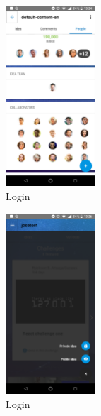 \begin{figure}[!h]
	\begin{center}
		\includegraphics[width=0.3\textwidth]{./img/anexo1/ver_idea_gente_expandido.png}
		\caption{Login}
		\label{fig:ver_idea_gente_expandido}
	\end{center}
\end{figure}

\begin{figure}[!h]
	\begin{center}
		\includegraphics[width=0.3\textwidth]{./img/anexo1/inicio_crear_idea.png}
		\caption{Login}
		\label{fig:inicio_crear_idea}
	\end{center}
\end{figure}

